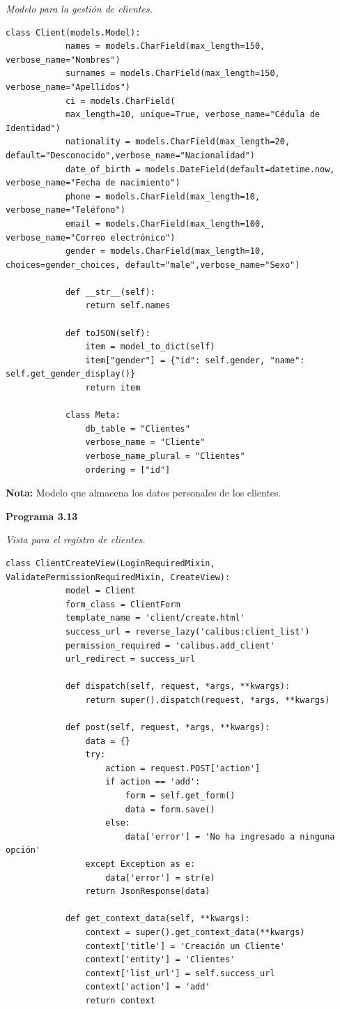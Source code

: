 	\textit{Modelo para la gestión de clientes.} %
	\vspace{0.3cm} %
	\begin{lstlisting}[lineskip=-1pt]
		class Client(models.Model):
			names = models.CharField(max_length=150, verbose_name="Nombres")
			surnames = models.CharField(max_length=150, verbose_name="Apellidos")
			ci = models.CharField(
			max_length=10, unique=True, verbose_name="Cédula de Identidad")
			nationality = models.CharField(max_length=20, default="Desconocido",verbose_name="Nacionalidad")
			date_of_birth = models.DateField(default=datetime.now, verbose_name="Fecha de nacimiento")
			phone = models.CharField(max_length=10, verbose_name="Teléfono")
			email = models.CharField(max_length=100, verbose_name="Correo electrónico")
			gender = models.CharField(max_length=10, choices=gender_choices, default="male",verbose_name="Sexo")
		
			def __str__(self):
				return self.names
			
			def toJSON(self):
				item = model_to_dict(self)
				item["gender"] = {"id": self.gender, "name": self.get_gender_display()}
				return item
		
			class Meta:
				db_table = "Clientes"
				verbose_name = "Cliente"
				verbose_name_plural = "Clientes"
				ordering = ["id"]
	\end{lstlisting}
	
	\textbf{Nota:} Modelo que almacena los datos personales de los clientes.
	
	\textbf{Programa 3.13}
	
	\textit{Vista para el registro de clientes.} %
	\vspace{0.3cm} %
	\begin{lstlisting}[lineskip=-1pt]
		class ClientCreateView(LoginRequiredMixin, ValidatePermissionRequiredMixin, CreateView):
			model = Client
			form_class = ClientForm
			template_name = 'client/create.html'
			success_url = reverse_lazy('calibus:client_list')
			permission_required = 'calibus.add_client'
			url_redirect = success_url
		
			def dispatch(self, request, *args, **kwargs):
				return super().dispatch(request, *args, **kwargs)
		
			def post(self, request, *args, **kwargs):
				data = {}
				try:
					action = request.POST['action']
					if action == 'add':
						form = self.get_form()
						data = form.save()
					else:
						data['error'] = 'No ha ingresado a ninguna opción'
				except Exception as e:
					data['error'] = str(e)
				return JsonResponse(data)
			
			def get_context_data(self, **kwargs):
				context = super().get_context_data(**kwargs)
				context['title'] = 'Creación un Cliente'
				context['entity'] = 'Clientes'
				context['list_url'] = self.success_url
				context['action'] = 'add'
				return context
	\end{lstlisting}
	
